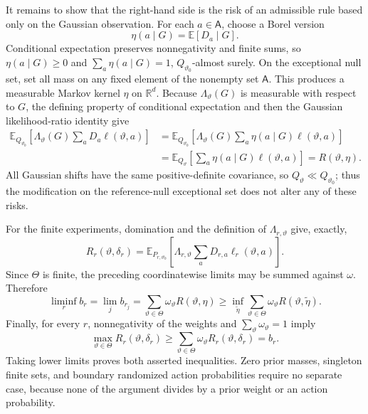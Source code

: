 It remains to show that the right-hand side is the risk of an admissible rule based only on the Gaussian observation. For each \(a\in\mathsf A\), choose a Borel version
\[
 \eta(a\mid G)=\mathbb E[D_a\mid G].
\]
Conditional expectation preserves nonnegativity and finite sums, so \(\eta(a\mid G)\geq0\) and \(\sum_a\eta(a\mid G)=1\), \(Q_{\vartheta_0}\)-almost surely. On the exceptional null set, set all mass on any fixed element of the nonempty set \(\mathsf A\). This produces a measurable Markov kernel \(\eta\) on \(\mathbb R^d\). Because \(\Lambda_\vartheta(G)\) is measurable with respect to \(G\), the defining property of conditional expectation and then the Gaussian likelihood-ratio identity give
\[
 \begin{aligned}
 \mathbb E_{Q_{\vartheta_0}}\!\left[
  \Lambda_\vartheta(G)\sum_aD_a\ell(\vartheta,a)
 \right]
 &=\mathbb E_{Q_{\vartheta_0}}\!\left[
  \Lambda_\vartheta(G)\sum_a\eta(a\mid G)\ell(\vartheta,a)
 \right]\\
 &=\mathbb E_{Q_\vartheta}\!\left[
  \sum_a\eta(a\mid G)\ell(\vartheta,a)
 \right]
 =R(\vartheta,\eta).
 \end{aligned}
\]
All Gaussian shifts have the same positive-definite covariance, so \(Q_\vartheta\ll Q_{\vartheta_0}\); thus the modification on the reference-null exceptional set does not alter any of these risks.

For the finite experiments, domination and the definition of \(\Lambda_{r,\vartheta}\) give, exactly,
\[
 R_r(\vartheta,\delta_r)
 =\mathbb E_{P_{r,\vartheta_0}}\!\left[
  \Lambda_{r,\vartheta}\sum_aD_{r,a}\ell_r(\vartheta,a)
 \right].
\]
Since \(\Theta\) is finite, the preceding coordinatewise limits may be summed against \(\omega\). Therefore
\[
 \liminf_r b_r
 =\lim_j b_{r_j}
 =\sum_{\vartheta\in\Theta}\omega_\vartheta R(\vartheta,\eta)
 \geq\inf_{\widetilde\eta}
       \sum_{\vartheta\in\Theta}\omega_\vartheta
       R(\vartheta,\widetilde\eta).
\]
Finally, for every \(r\), nonnegativity of the weights and \(\sum_\vartheta\omega_\vartheta=1\) imply
\[
 \max_{\vartheta\in\Theta}R_r(\vartheta,\delta_r)
 \geq\sum_{\vartheta\in\Theta}\omega_\vartheta
       R_r(\vartheta,\delta_r)=b_r.
\]
Taking lower limits proves both asserted inequalities. Zero prior masses, singleton finite sets, and boundary randomized action probabilities require no separate case, because none of the argument divides by a prior weight or an action probability.